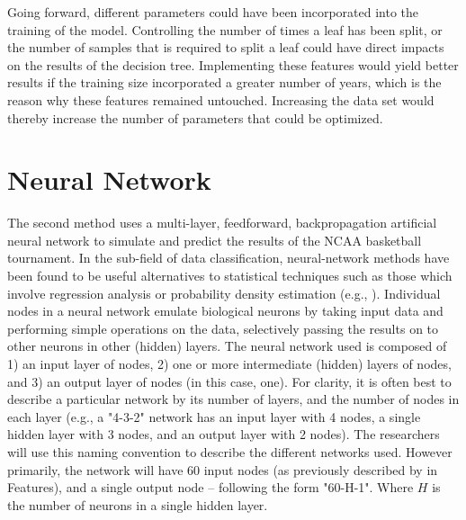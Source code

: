\documentclass[conference]{IEEEtran}
\begin{document}
{Going forward, different parameters could have been incorporated into the training of the model. Controlling the number of times a leaf has been split, or the number of samples that is required to split a leaf could have direct impacts on the results of the decision tree. Implementing these features would yield better results if the training size incorporated a greater number of years, which is the reason why these features remained untouched. Increasing the data set would thereby increase the number of parameters that could be optimized. 






\section{Neural Network}
The second method uses a multi-layer, feedforward, backpropagation artificial neural network to simulate and predict the results of the NCAA basketball tournament.
In the sub-field of data classification, neural-network methods have been found to be useful alternatives to statistical techniques such as those which involve regression analysis or probability density estimation (e.g., \cite{Holmstrom-1192}).
Individual nodes in a neural network emulate biological neurons by taking input data and performing simple operations on the data, selectively passing the results on to other neurons in other (hidden) layers.
The neural network used is composed of 1) an input layer of nodes, 2) one or more intermediate (hidden) layers of nodes, and 3) an output layer of nodes (in this case, one).
For clarity, it is often best to describe a particular network by its number of layers, and the number of nodes in each layer (e.g., a "4-3-2" network has an input layer with 4 nodes, a single hidden layer with 3 nodes, and an output layer with 2 nodes).
The researchers will use this naming convention to describe the different networks used.
However primarily, the network will have 60 input nodes (as previously described by in Features), and a single output node -- following the form "60-H-1".
Where $H$ is the number of neurons in a single hidden layer.

}
\end{document}
